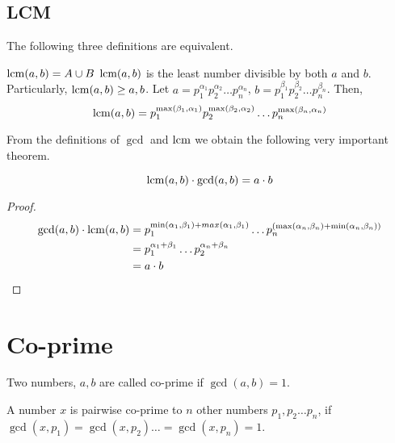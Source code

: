 \subsection{LCM}

\begin{definition}
    [LCM]
    The following three definitions are equivalent.
    \begin{itemize}
        \ii \(\operatorname*{lcm}(a,b) = A \cup B\)
        \ii \(\operatorname*{lcm}(a,b)\) is the least number divisible by both \(a\) and \(b\). Particularly, \(\operatorname*{lcm}(a,b) \ge a,b\).
        \ii Let \(a = p_{1} ^{\alpha_1} p_{2} ^{\alpha_2} \ldots p_{n}^{\alpha_n}\), \(b = p_{1} ^{\beta_1} p_{2} ^{\beta_2} \ldots p_{n}^{\beta_n}\). Then, \[\operatorname*{lcm}(a,b)= p_{1} ^{\max(\beta_1, \alpha_1)} p_{2} ^{\max(\beta_2, \alpha_2)} \ldots p_{n}^{\max(\beta_n, \alpha_n)} \]
    \end{itemize}
    
    
\end{definition}


From the definitions of \(\gcd\) and \(\operatorname*{lcm}\) we obtain the following very important theorem.

\begin{theorem}
    \[\operatorname*{lcm}(a,b)\cdot \gcd(a,b) = a\cdot b \]
\end{theorem}

\begin{proof}
    
    
    \begin{align*}
        \gcd(a,b) \cdot \operatorname*{lcm}(a,b) &= p_{1}^{\min(\alpha_1,\beta_1) + max(\alpha_1,\beta_1)} \ldots p_{n}^{(\max(\alpha_n, \beta_n) + \min(\alpha_n, \beta_n))}\\
        &= p_{1}^{\alpha_1 + \beta_1} \ldots p_2^{\alpha_n + \beta_n}\\
        &= a\cdot b
    \end{align*}    
    
    
\end{proof}



\section{Co-prime}

\begin{definition}
    Two numbers, \(a, b\) are called co-prime if \(\gcd(a,b)=1\).
\end{definition}

\begin{definition}
    A number \(x\) is pairwise co-prime to \(n\) other numbers \(p_{1}, p_{2} \ldots p_{n}\), if \( \gcd(x, p_1) = \gcd(x, p_2) \ldots = \gcd(x, p_n) =1 \).
\end{definition}

